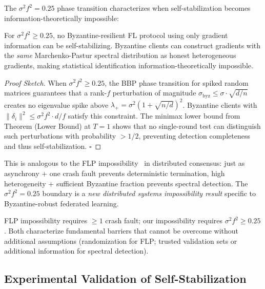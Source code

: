 \documentclass[runningheads]{llncs}
\begin{document}
The $\sigma^2 f^2 = 0.25$ phase transition characterizes when self-stabilization becomes information-theoretically impossible:

\begin{theorem}
\label{thm:phase_impossibility}
For $\sigma^2 f^2 \geq 0.25$, no Byzantine-resilient FL protocol using only gradient information can be self-stabilizing. Byzantine clients can construct gradients with the \emph{same} Marchenko-Pastur spectral distribution as honest heterogeneous gradients, making statistical identification information-theoretically impossible.
\end{theorem}

\begin{proof}[Proof Sketch]
When $\sigma^2 f^2 \geq 0.25$, the BBP phase transition for spiked random matrices guarantees that a rank-$f$ perturbation of magnitude $\sigma_{\text{byz}} \leq \sigma \cdot \sqrt{d/n}$ creates no eigenvalue spike above $\lambda_+ = \sigma^2(1+\sqrt{n/d})^2$. Byzantine clients with $\|\delta_i\|^2 \leq \sigma^2 f^2 \cdot d/f$ satisfy this constraint. The minimax lower bound from Theorem (Lower Bound) at $T=1$ shows that no single-round test can distinguish such perturbations with probability $> 1/2$, preventing detection completeness and thus self-stabilization. \hfill$\square$
\end{proof}

This is analogous to the FLP impossibility~\cite{flp_impossibility} in distributed consensus: just as asynchrony + one crash fault prevents deterministic termination, high heterogeneity + sufficient Byzantine fraction prevents spectral detection. The $\sigma^2 f^2 = 0.25$ boundary is a \emph{new distributed systems impossibility result} specific to Byzantine-robust federated learning.

\begin{remark}
FLP impossibility requires $\geq 1$ crash fault; our impossibility requires $\sigma^2 f^2 \geq 0.25$. Both characterize fundamental barriers that cannot be overcome without additional assumptions (randomization for FLP; trusted validation sets or additional information for spectral detection).
\end{remark}

\subsection{Experimental Validation of Self-Stabilization}
\end{document}
